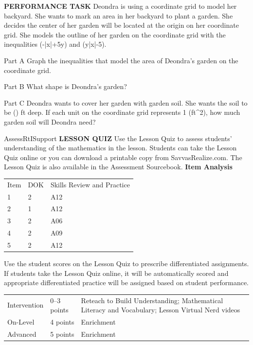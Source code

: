 \documentclass{article}
\newenvironment{practice}[2]{}{}        %
\newenvironment{te-addendum}[2]{}{}     %
\newcommand{\answer}[1]{}               %
\newcommand{\placeholder}[2]{}          %
\newcommand{\te}[1]{}                   %
\begin{document}
\begin{practice}{35}{3}
\textbf{PERFORMANCE TASK} Deondra is using a coordinate grid to model her backyard. She wants to mark an area in her backyard to plant a garden. She decides the center of her garden will be located at the origin on her coordinate grid. She models the outline of her garden on the coordinate grid with the inequalities (-|x|+5\geq y) and (y\leq{}|x|-5).
\placeholder{illustration}{Backyard illustration with shed at rear, planted garden beds, and coordinate grid across the center. Horizontal x and vertical y axes, origin O, labels -10,-5,5,10, extending roughly -12 to 12; no solution curves on this student grid.}
Part A Graph the inequalities that model the area of Deondra's garden on the coordinate grid.
\placeholder{graph}{Teacher answer graph on grid with spacing 2, x,y axes and arrows, labels -8,-4,O,4,8, approximately [-12,12] on both axes. Solid blue inverted V y=-|x|/2+5 vertex (0,5), shaded blue below, and solid blue upright V y=|x|/2-5 vertex (0,-5), shaded yellow above. Green overlapping diamond has vertices (-10,0),(0,5),(10,0),(0,-5). Boundary rays have arrows.}
\answer{See graph.}
\te{Printed second inequality y\leq\frac12|x|-5; likely y\geq\frac12|x|-5 to match the printed graph and bounded garden.}
Part B What shape is Deondra's garden?
\answer{Parallelogram}
Part C Deondra wants to cover her garden with garden soil. She wants the soil to be () ft deep. If each unit on the coordinate grid represents 1 (ft^2), how much garden soil will Deondra need?
\answer{50 (ft^3)}
\end{practice}
\begin{te-addendum}{Assess}{RtISupport}
\textbf{LESSON QUIZ}
Use the Lesson Quiz to assess students' understanding of the mathematics in the lesson.
Students can take the Lesson Quiz online or you can download a printable copy from SavvasRealize.com. The Lesson Quiz is also available in the Assessment Sourcebook.
\textbf{Item Analysis}
\begin{tabular}{lll}
Item & DOK & Skills Review and Practice \\
1 & 2 & A12 \\
2 & 1 & A12 \\
3 & 2 & A06 \\
4 & 2 & A09 \\
5 & 2 & A12 \\
\end{tabular}
Use the student scores on the Lesson Quiz to prescribe differentiated assignments.
If students take the Lesson Quiz online, it will be automatically scored and appropriate differentiated practice will be assigned based on student performance.
\begin{tabular}{lll}
Intervention & 0--3 points & Reteach to Build Understanding; Mathematical Literacy and Vocabulary; Lesson Virtual Nerd videos \\
On-Level & 4 points & Enrichment \\
Advanced & 5 points & Enrichment \\
\end{tabular}
\end{te-addendum}
\end{document}
